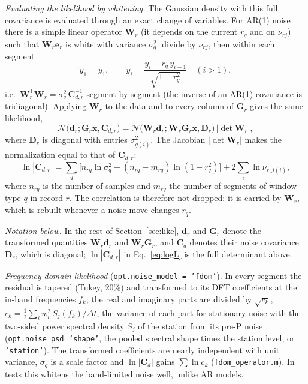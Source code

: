 \documentclass[11pt]{article}
\newcommand{\T}{\mathsf{T}}
\begin{document}
\emph{Evaluating the likelihood by whitening.} The Gaussian density with
this full covariance is evaluated through an exact change of variables.
For AR(1) noise there is a simple linear operator $\mathbf{W}_r$ (it
depends on the current $r_q$ and on $\nu_{rj}$) such that
$\mathbf{W}_r\mathbf{e}_r$ is white with variance $\sigma_q^2$: divide by
$\nu_{rj}$, then within each segment
\begin{equation}
 \tilde y_{1}=y_{1},\qquad \tilde y_i=\frac{y_i-r_q\,y_{i-1}}{\sqrt{1-r_q^2}}\quad(i>1),
\end{equation}
i.e.\ $\mathbf{W}_r^\T\mathbf{W}_r=\sigma_q^2\,\mathbf{C}_{d,r}^{-1}$
segment by segment (the inverse of an AR(1) covariance is tridiagonal).
Applying $\mathbf{W}_r$ to the data and to every column of $\mathbf{G}_r$
gives the same likelihood,
\begin{equation}
 \mathcal{N}\big(\mathbf{d}_r;\mathbf{G}_r\mathbf{x},\mathbf{C}_{d,r}\big)
 =\mathcal{N}\big(\mathbf{W}_r\mathbf{d}_r;\mathbf{W}_r\mathbf{G}_r\mathbf{x},\mathbf{D}_r\big)\,|\det\mathbf{W}_r|,
\end{equation}
where $\mathbf{D}_r$ is diagonal with entries $\sigma_{q(i)}^2$. The
Jacobian $|\det\mathbf{W}_r|$ makes the normalization equal to that of
$\mathbf{C}_{d,r}$:
\begin{equation}
 \ln|\mathbf{C}_{d,r}|=\sum_q\big[n_{rq}\ln\sigma_q^2+(n_{rq}-m_{rq})\ln(1-r_q^2)\big]+2\sum_{i}\ln\nu_{r,j(i)},
\end{equation}
where $n_{rq}$ is the number of samples and $m_{rq}$ the number of
segments of window type $q$ in record $r$. The correlation is therefore not
dropped: it is carried by $\mathbf{W}_r$, which is rebuilt whenever a
noise move changes $r_q$.

\emph{Notation below.} In the rest of Section~\ref{sec:like},
$\mathbf{d}_r$ and $\mathbf{G}_r$ denote the transformed quantities
$\mathbf{W}_r\mathbf{d}_r$ and $\mathbf{W}_r\mathbf{G}_r$, and
$\mathbf{C}_d$ denotes their noise covariance $\mathbf{D}_r$, which is
diagonal; $\ln|\mathbf{C}_{d,r}|$ in Eq.~\eqref{eq:logL} is the full
determinant above.

\emph{Frequency-domain likelihood} (\texttt{opt.noise\_model = 'fdom'}).
In every segment the residual is tapered (Tukey, 20\%) and transformed to
its DFT coefficients at the in-band frequencies $f_k$; the real and
imaginary parts are divided by $\sqrt{c_k}$,
$c_k=\tfrac12\sum_iw_i^2\,S_j(f_k)/\Delta t$, the variance of each part for
stationary noise with the two-sided power spectral density $S_j$ of the
station from its pre-P noise (\texttt{opt.noise\_psd}: \texttt{'shape'},
the pooled spectral shape times the station level, or \texttt{'station'}).
The transformed coefficients are nearly independent with unit variance,
$\sigma_q$ is a scale factor and $\ln|\mathbf{C}_d|$ gains
$\sum\ln c_k$ (\texttt{fdom\_operator.m}). In tests this whitens the
band-limited noise well, unlike AR models.
\end{document}
